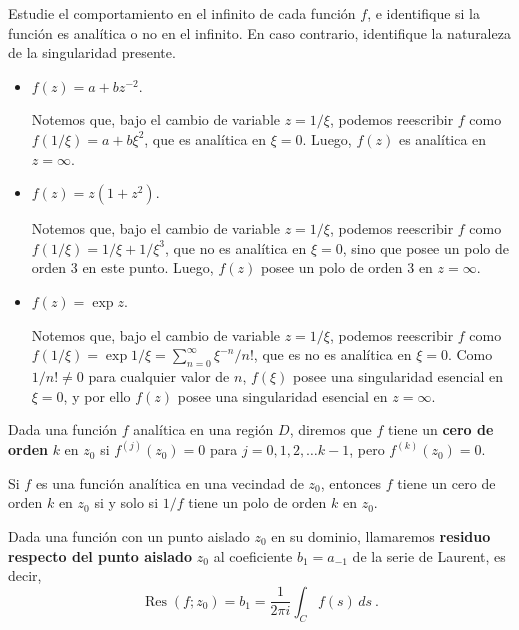\begin{ejemplo}
    Estudie el comportamiento en el infinito de cada función $f$, e identifique si la función es analítica o no en el infinito. En caso contrario, identifique la naturaleza de la singularidad presente.

    \begin{itemize}
        \item $f(z) = a + bz^{-2}$.
        
        Notemos que, bajo el cambio de variable $z = 1/\xi$, podemos reescribir $f$ como $f(1/\xi) = a + b\xi^2$, que es analítica en $\xi=0$. Luego, $f(z)$ es analítica en $z = \infty$.

        \item $f(z) = z(1+z^2)$.
        
        Notemos que, bajo el cambio de variable $z = 1/\xi$, podemos reescribir $f$ como $f(1/\xi) = 1/\xi + 1/\xi^3$, que no es analítica en $\xi=0$, sino que posee un polo de orden 3 en este punto. Luego, $f(z)$ posee un polo de orden 3 en $z = \infty$.

        \item $f(z) = \exp z$.
        
        Notemos que, bajo el cambio de variable $z = 1/\xi$, podemos reescribir $f$ como $f(1/\xi) = \exp 1/\xi = \sum\limits_{n=0}^\infty \xi^{-n}/n!$, que es no es analítica en $\xi=0$. Como $1/n! \neq 0$ para cualquier valor de $n$, $f(\xi)$ posee una singularidad esencial en $\xi = 0$, y por ello $f(z)$ posee una singularidad esencial en $z = \infty$. 
    \end{itemize}
\end{ejemplo}

\begin{defi}
    Dada una función $f$ analítica en una región $D$, diremos que $f$ tiene un \textbf{cero de orden} $k$ en $z_0$ si $f^{(j)}(z_0) = 0$ para $j = 0, 1, 2, \dots k-1$, pero $f^{(k)}(z_0) = 0$.
\end{defi}

\begin{teorema}
    Si $f$ es una función analítica en una vecindad de $z_0$, entonces $f$ tiene un cero de orden $k$ en $z_0$ si y solo si $1/f$ tiene un polo de orden $k$ en $z_0$.
\end{teorema}

\begin{defi}
    Dada una función con un punto aislado $z_0$ en su dominio, llamaremos \textbf{residuo respecto del punto aislado} $z_0$ al coeficiente $b_1 = a_{-1}$ de la serie de Laurent, es decir,
    \begin{equation}
        \operatorname{Res}(f; z_0) = b_1 = \frac{1}{2\pi i} \int_C f(s) \, ds \ .
    \end{equation}
\end{defi}


